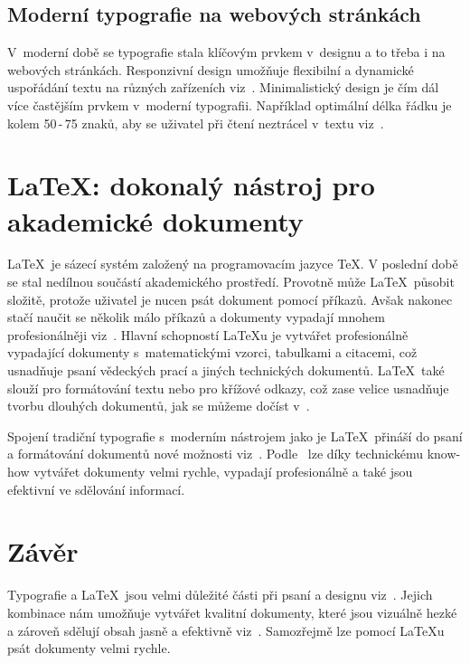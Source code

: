 \documentclass[a4paper, 11pt]{article}
\begin{document}
\subsection{Moderní typografie na webových stránkách}

V~moderní době se typografie stala klíčovým prvkem v~designu a to třeba i na webových stránkách. Responzivní design umožňuje flexibilní a dynamické uspořádání textu na různých zařízeních viz~\cite{FontgemGuideForBegginers}. Minimalistický design je čím dál více častějším prvkem v~moderní typografii. Například optimální délka řádku je kolem 50\,-\,75 znaků, aby se uživatel při čtení neztrácel v~textu viz~\cite{FontgemWebDesign}.

\section{\LaTeX : dokonalý nástroj pro akademické dokumenty}

\LaTeX~je sázecí systém založený na programovacím jazyce \TeX . V poslední době se stal nedílnou součástí akademického prostředí. Provotně může \LaTeX~působit složitě, protože uživatel je nucen psát dokument pomocí příkazů. Avšak nakonec stačí naučit se několik málo příkazů a dokumenty vypadají mnohem profesionálněji viz~\cite{Rybicka2003}. Hlavní schopností \LaTeX u je vytvářet profesionálně vypadající dokumenty s~matematickými vzorci, tabulkami a citacemi, což usnadňuje psaní vědeckých prací a jiných technických dokumentů. \LaTeX~také slouží pro formátování textu nebo pro křížové odkazy, což zase velice usnadňuje tvorbu dlouhých dokumentů, jak se můžeme dočíst v~\cite{Gratzer2013}. 

Spojení tradiční typografie s~moderním nástrojem jako je \LaTeX~přináší do psaní a formátování dokumentů nové možnosti viz~\cite{Jiricek2012}. Podle~\cite{Bednar2011} lze díky technickému know-how vytvářet dokumenty velmi rychle, vypadají profesionálně a také jsou efektivní ve sdělování informací.

\section{Závěr}

Typografie a \LaTeX~jsou velmi důležité části při psaní a designu viz~\cite{Huys2023}. Jejich kombinace nám umožňuje vytvářet kvalitní dokumenty, které jsou vizuálně hezké a zároveň sdělují obsah jasně a efektivně viz~\cite{Kafka2017}. Samozřejmě lze pomocí \LaTeX u psát dokumenty velmi rychle.

\newpage



\end{document}

